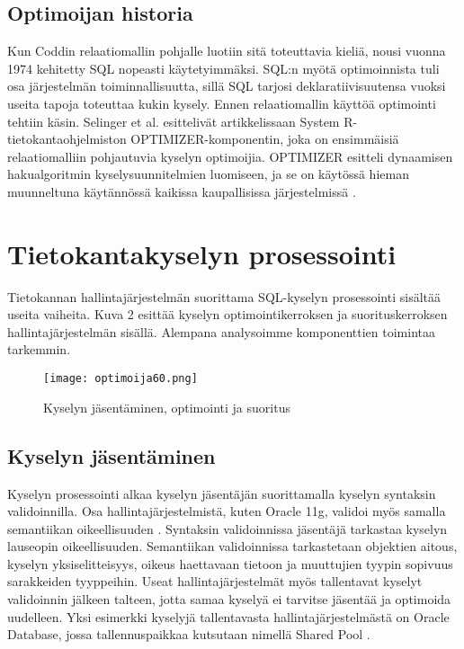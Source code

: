 \documentclass[finnish]{tktltiki2}
\theoremstyle{definition}
\theoremstyle{remark}
\begin{document}
\subsection{Optimoijan historia}
Kun Coddin relaatiomallin pohjalle luotiin sitä toteuttavia kieliä, nousi vuonna 1974 kehitetty SQL nopeasti käytetyimmäksi. SQL:n myötä optimoinnista tuli osa järjestelmän toiminnallisuutta, sillä SQL tarjosi deklaratiivisuutensa vuoksi useita tapoja toteuttaa kukin kysely. Ennen relaatiomallin käyttöä optimointi tehtiin käsin.
Selinger et al. esittelivät artikkelissaan \cite{selinger1979access} System R-tietokantaohjelmiston OPTIMIZER-komponentin, joka on ensimmäisiä relaatiomalliin pohjautuvia kyselyn optimoijia. OPTIMIZER esitteli dynaamisen hakualgoritmin kyselysuunnitelmien luomiseen, ja se on käytössä hieman muunneltuna käytännössä kaikissa kaupallisissa järjestelmissä \cite{ioannidis1996query}. 


\section{Tietokantakyselyn prosessointi}
Tietokannan hallintajärjestelmän suorittama SQL-kyselyn prosessointi sisältää useita vaiheita. Kuva 2 esittää kyselyn optimointikerroksen ja suorituskerroksen hallintajärjestelmän sisällä. Alempana analysoimme komponenttien toimintaa tarkemmin.

\begin{figure}[!h]
  \caption{Kyselyn jäsentäminen, optimointi ja suoritus \cite{ramakrishnan2003database}}
  \centering
    \texttt{[image: optimoija60.png]}
\end{figure}

\subsection{Kyselyn jäsentäminen}
Kyselyn prosessointi alkaa kyselyn jäsentäjän suorittamalla kyselyn syntaksin validoinnilla. \cite{selinger1979access} Osa hallintajärjestelmistä, kuten Oracle 11g, validoi myös samalla semantiikan oikeellisuuden \cite{oracle2009doc}. 
Syntaksin validoinnissa jäsentäjä tarkastaa kyselyn lauseopin oikeellisuuden. Semantiikan validoinnissa tarkastetaan objektien aitous, kyselyn yksiselitteisyys, oikeus haettavaan tietoon ja muuttujien tyypin sopivuus sarakkeiden tyyppeihin. Useat hallintajärjestelmät myös
tallentavat kyselyt validoinnin jälkeen talteen, jotta samaa kyselyä ei tarvitse jäsentää ja optimoida uudelleen. Yksi esimerkki kyselyjä tallentavasta hallintajärjestelmästä on Oracle Database, jossa tallennuspaikkaa kutsutaan nimellä Shared Pool \cite{oracle2005doc}. 
\end{document}
